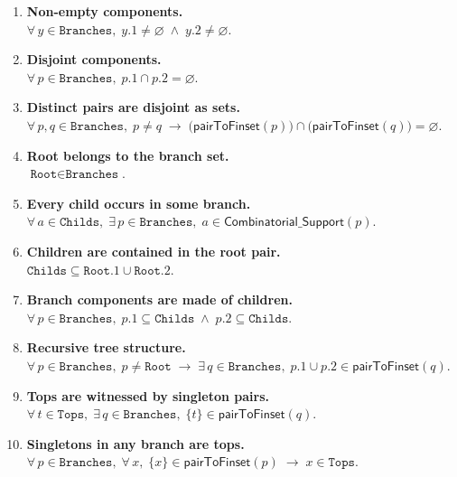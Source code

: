 \documentclass[11pt]{amsart}
\theoremstyle{remark}            %
\newcommand{\pairToFinset}{\mathsf{pairToFinset}}
\newcommand{\supp}{\mathsf{Combinatorial\_Support}}
\begin{document}
\begin{enumerate}[label=\textbf{(\arabic*)},leftmargin=1.5em]
  \item \textbf{Non-empty components.}\\
        $\forall\,y\in\texttt{Branches},\; y.1\neq\varnothing\; \land\; y.2\neq\varnothing$.

  \item \textbf{Disjoint components.}\\
        $\forall\,p\in\texttt{Branches},\; p.1\cap p.2 = \varnothing$.

  \item \textbf{Distinct pairs are disjoint as sets.}\\
        $\forall\,p,q\in\texttt{Branches},\; p\neq q \;\to\;
        \bigl(\pairToFinset(p)\bigr)\cap\bigl(\pairToFinset(q)\bigr)=\varnothing$.

  \item \textbf{Root belongs to the branch set.}\\
        $\texttt{Root}\in\texttt{Branches}$.

  \item \textbf{Every child occurs in some branch.}\\
        $\forall\,a\in\texttt{Childs},\;\exists\,p\in\texttt{Branches},\;
        a\in\supp(p)$.

  \item \textbf{Children are contained in the root pair.}\\
        $\texttt{Childs}\subseteq\texttt{Root}.1\cup\texttt{Root}.2$.

  \item \textbf{Branch components are made of children.}\\
        $\forall\,p\in\texttt{Branches},\;
        p.1\subseteq\texttt{Childs}\;\land\; p.2\subseteq\texttt{Childs}$.

  \item \textbf{Recursive tree structure.}\\
        $\forall\,p\in\texttt{Branches},\; p\neq\texttt{Root}\;
        \to\; \exists\,q\in\texttt{Branches},\;
        p.1\cup p.2 \in \pairToFinset(q)$.

  \item \textbf{Tops are witnessed by singleton pairs.}\\
        $\forall\,t\in\texttt{Tops},\;\exists\,q\in\texttt{Branches},\;
        \{t\}\in\pairToFinset(q)$.

  \item \textbf{Singletons in any branch are tops.}\\
        $\forall\,p\in\texttt{Branches},\;
        \forall\,x,\; \{x\}\in\pairToFinset(p)\;\to\; x\in\texttt{Tops}$.


\end{enumerate}
\end{document}
